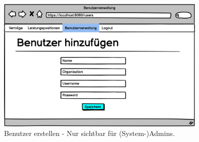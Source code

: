\begin{figure}[h]
\centering
\includegraphics[width=10cm]{img/mockup_web/admin-nutzer-erstellung.png}
\caption{Benutzer erstellen - Nur sichtbar für (System-)Admins.}
\end{figure}